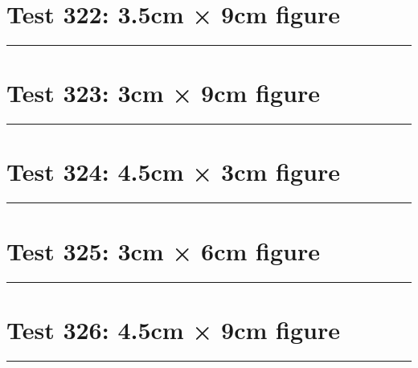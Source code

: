 \documentclass[a4paper,11pt]{article}
\begin{document}
\section*{Test 322: 3.5cm × 9cm figure}
\begin{swarmwrap}%
  \begin{minipage}[t]{3cm}
    \centering
    \rule{\linewidth}{9cm}
  \end{minipage}%
\end{swarmwrap}%
\swarmwrapnext
\lipsum[107]
\lipsum[108]
\lipsum[109]
\lipsum[110]
\section*{Test 323: 3cm × 9cm figure}
\begin{swarmwrap}%
  \begin{minipage}[t]{3cm}
    \centering
    \rule{\linewidth}{9cm}
  \end{minipage}%
\end{swarmwrap}%
\swarmwrapnext
\lipsum[108]
\lipsum[109]
\lipsum[110]
\lipsum[111]
\lipsum[112]
\lipsum[113]
\section*{Test 324: 4.5cm × 3cm figure}
\begin{swarmwrap}%
  \begin{minipage}[t]{4cm}
    \centering
    \rule{\linewidth}{3cm}
  \end{minipage}%
\end{swarmwrap}%
\swarmwrapnext
\lipsum[111]
\lipsum[112]
\lipsum[113]
\lipsum[114]
\lipsum[115]
\section*{Test 325: 3cm × 6cm figure}
\begin{swarmwrap}%
  \begin{minipage}[t]{3cm}
    \centering
    \rule{\linewidth}{6cm}
  \end{minipage}%
\end{swarmwrap}%
\swarmwrapnext
\lipsum[41]
\lipsum[42]
\lipsum[43]
\lipsum[44]
\lipsum[45]
\section*{Test 326: 4.5cm × 9cm figure}
\begin{swarmwrap}%
  \begin{minipage}[t]{4cm}
    \centering
    \rule{\linewidth}{9cm}
  \end{minipage}%
\end{swarmwrap}%
\swarmwrapnext
\lipsum[25]
\lipsum[26]
\lipsum[27]
\end{document}

